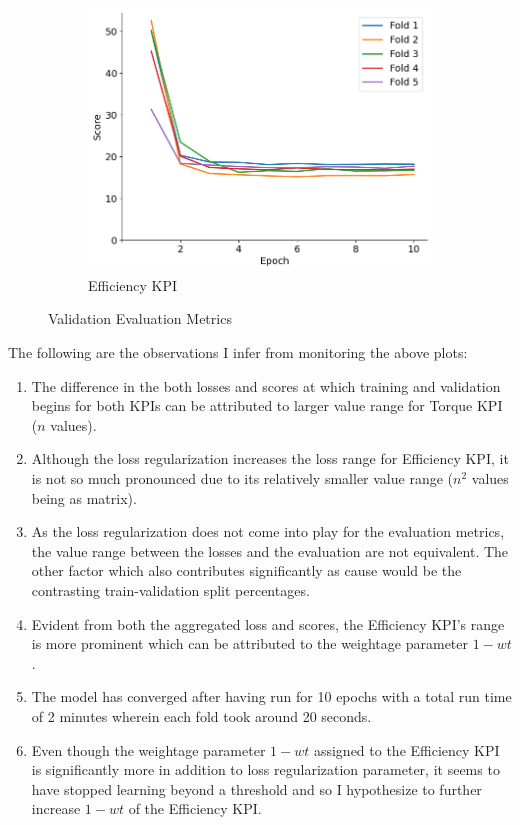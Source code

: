 \documentclass{report} %
\begin{document}
\begin{figure}[H]
    \begin{subfigure}{0.32\textwidth}
        \centering
        \includegraphics[width=\textwidth]{./ReportImages/val_score_y2.png}
        \caption{\centering Efficiency \ac{KPI}}
        \label{fig:Validation Score for Efficiency grid}
    \end{subfigure}
    \caption{Validation Evaluation Metrics}
    \label{fig:Validation Evaluation Metrics}
\end{figure} 

The following are the observations I infer from monitoring the above plots:

\begin{enumerate}[nosep]
    \item The difference in the both losses and scores at which training and validation begins for both \ac{KPI}s can be attributed to larger value range for 
    Torque \ac{KPI} ($n$ values). 
    \item Although the loss regularization increases the loss range for Efficiency \ac{KPI}, it is not so much pronounced due to its relatively smaller value 
    range ($n^2$ values being as matrix).
    \item As the loss regularization does not come into play for the evaluation metrics, the value range between the losses and the evaluation are not equivalent. 
    The other factor which also contributes significantly as cause would be the contrasting train-validation split percentages.
    \item Evident from both the aggregated loss and scores, the Efficiency \ac{KPI}'s range is more prominent which can be attributed to the weightage parameter $1-wt$.
    \item The model has converged after having run for 10 epochs with a total run time of 2 minutes wherein each fold took around 20 seconds.
    \item Even though the weightage parameter $1-wt$ assigned to the Efficiency \ac{KPI} is significantly more in addition to loss regularization parameter, it seems to 
    have stopped learning beyond a threshold and so I hypothesize to further increase $1-wt$ of the Efficiency \ac{KPI}.\\
\end{enumerate}
\end{document}
